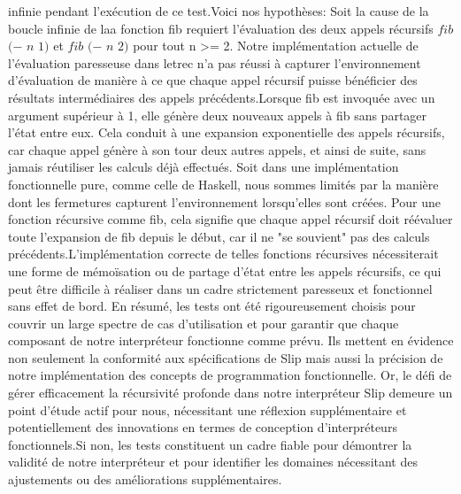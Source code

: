 \documentclass[10pt]{article}
\begin{document}
infinie pendant l'exécution de ce test.Voici nos hypothèses: Soit la cause de la boucle infinie de laa fonction fib requiert l'évaluation des deux appels récursifs $fib$ $(-$ $n$ $1)$ et $fib$ $(-$ $n$ $2)$ pour tout n >= 2. Notre implémentation actuelle de l'évaluation paresseuse dans letrec n'a pas réussi à capturer l'environnement d'évaluation de manière à ce que chaque appel récursif puisse bénéficier des résultats intermédiaires des appels précédents.Lorsque fib est invoquée avec un argument supérieur à 1, elle génère deux nouveaux appels à fib sans partager l'état entre eux. Cela conduit à une expansion exponentielle des appels récursifs, car chaque appel génère à son tour deux autres appels, et ainsi de suite, sans jamais réutiliser les calculs déjà effectués. Soit dans une implémentation fonctionnelle pure, comme celle de Haskell, nous sommes limités par la manière dont les fermetures capturent l'environnement lorsqu'elles sont créées. Pour une fonction récursive comme fib, cela signifie que chaque appel récursif doit réévaluer toute l'expansion de fib depuis le début, car il ne "se souvient" pas des calculs précédents.L'implémentation correcte de telles fonctions récursives nécessiterait une forme de mémoïsation ou de partage d'état entre les appels récursifs, ce qui peut être difficile à réaliser dans un cadre strictement paresseux et fonctionnel sans effet de bord. En résumé, les tests ont été rigoureusement choisis pour couvrir un large spectre de cas d'utilisation et pour garantir que chaque composant de notre interpréteur fonctionne comme prévu. Ils mettent en évidence non seulement la conformité aux spécifications de Slip mais aussi la précision de notre implémentation des concepts de programmation fonctionnelle. Or, le défi de gérer efficacement la récursivité profonde dans notre interpréteur Slip demeure un point d'étude actif pour nous, nécessitant une réflexion supplémentaire et potentiellement des innovations en termes de conception d'interpréteurs fonctionnels.Si non, les tests constituent un cadre fiable pour démontrer la validité de notre interpréteur et pour identifier les domaines nécessitant des ajustements ou des améliorations supplémentaires.
\end{document}
